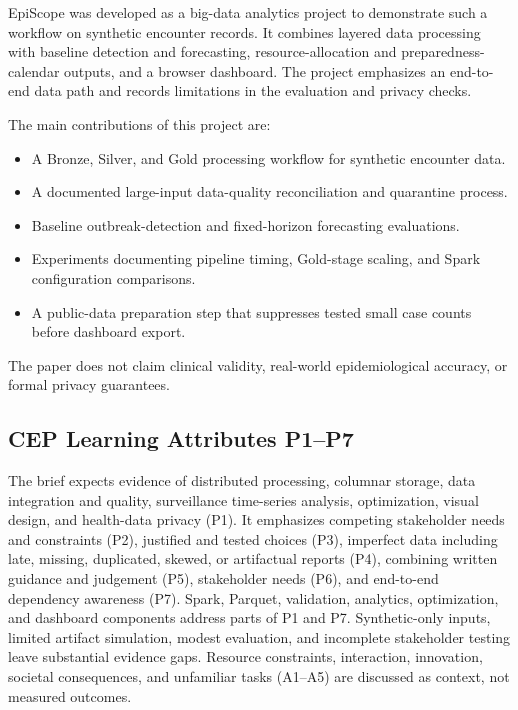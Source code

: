 ﻿\documentclass[conference]{IEEEtran}
\begin{document}
EpiScope was developed as a big-data analytics project to demonstrate such a workflow on synthetic encounter records. It combines layered data processing with baseline detection and forecasting, resource-allocation and preparedness-calendar outputs, and a browser dashboard. The project emphasizes an end-to-end data path and records limitations in the evaluation and privacy checks.

The main contributions of this project are:
\begin{itemize}
    \item A Bronze, Silver, and Gold processing workflow for synthetic encounter data.
    \item A documented large-input data-quality reconciliation and quarantine process.
    \item Baseline outbreak-detection and fixed-horizon forecasting evaluations.
    \item Experiments documenting pipeline timing, Gold-stage scaling, and Spark configuration comparisons.
    \item A public-data preparation step that suppresses tested small case counts before dashboard export.
\end{itemize}

The paper does not claim clinical validity, real-world epidemiological accuracy, or formal privacy guarantees.

\subsection{CEP Learning Attributes P1--P7}
The brief expects evidence of distributed processing, columnar storage, data integration and quality, surveillance time-series analysis, optimization, visual design, and health-data privacy (P1). It emphasizes competing stakeholder needs and constraints (P2), justified and tested choices (P3), imperfect data including late, missing, duplicated, skewed, or artifactual reports (P4), combining written guidance and judgement (P5), stakeholder needs (P6), and end-to-end dependency awareness (P7). Spark, Parquet, validation, analytics, optimization, and dashboard components address parts of P1 and P7. Synthetic-only inputs, limited artifact simulation, modest evaluation, and incomplete stakeholder testing leave substantial evidence gaps. Resource constraints, interaction, innovation, societal consequences, and unfamiliar tasks (A1--A5) are discussed as context, not measured outcomes.
\end{document}
